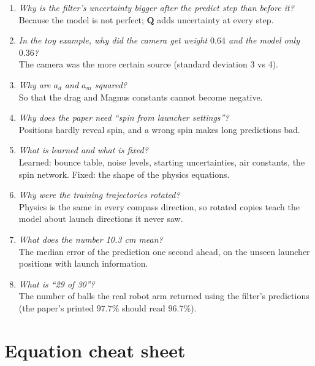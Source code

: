 \documentclass[11pt,a4paper]{article}
\begin{document}
\begin{enumerate}[label=\textbf{Q\arabic*.}]
\item \emph{Why is the filter's uncertainty bigger after the predict step than before it?}\\
Because the model is not perfect; $\mathbf Q$ adds uncertainty at every step.
\item \emph{In the toy example, why did the camera get weight $0.64$ and the model only $0.36$?}\\
The camera was the more certain source (standard deviation 3 vs 4).
\item \emph{Why are $a_d$ and $a_m$ squared?}\\
So that the drag and Magnus constants cannot become negative.
\item \emph{Why does the paper need ``spin from launcher settings''?}\\
Positions hardly reveal spin, and a wrong spin makes long predictions bad.
\item \emph{What is learned and what is fixed?}\\
Learned: bounce table, noise levels, starting uncertainties, air constants, the spin network. Fixed: the shape of the physics equations.
\item \emph{Why were the training trajectories rotated?}\\
Physics is the same in every compass direction, so rotated copies teach the model about launch directions it never saw.
\item \emph{What does the number 10.3 cm mean?}\\
The median error of the prediction one second ahead, on the unseen launcher positions with launch information.
\item \emph{What is ``29 of 30''?}\\
The number of balls the real robot arm returned using the filter's predictions (the paper's printed $97.7\%$ should read $96.7\%$).
\end{enumerate}

\appendix
\section{Equation cheat sheet}
\end{document}
